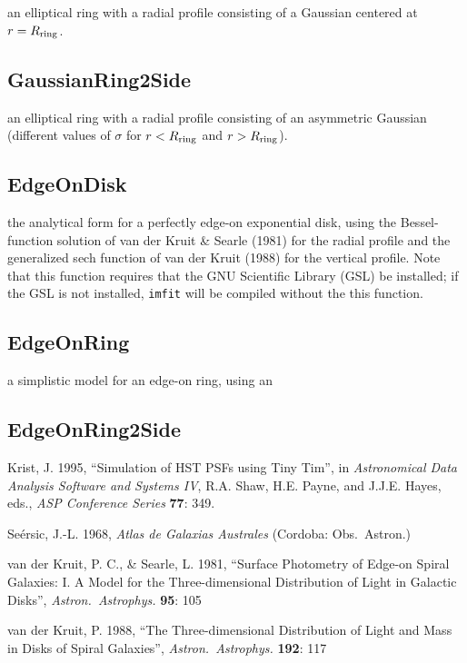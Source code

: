 \documentclass[10pt]{article}
\newcommand{\imfit}{\texttt{imfit}}
\begin{document}
an elliptical ring with a radial profile
consisting of a Gaussian centered at $r = R_{\rm ring}$.


\subsection{GaussianRing2Side}

an elliptical ring with a radial profile
consisting of an asymmetric Gaussian (different values of $\sigma$ for
$r < R_{\rm ring}$ and $r > R_{\rm ring}$).


\subsection{EdgeOnDisk}

the analytical form for a perfectly edge-on exponential
disk, using the Bessel-function solution of van der Kruit \& Searle (1981) for 
the radial profile and the generalized sech function of van der Kruit (1988) 
for the vertical profile. Note that this function requires that the GNU
Scientific Library (GSL) be installed; if the GSL is not installed, \imfit{}
will be compiled without the this function.


\subsection{EdgeOnRing}

a simplistic model for an edge-on ring, using an


\subsection{EdgeOnRing2Side}






\begin{thebibliography}{}

 Krist, J. 1995, ``Simulation of HST PSFs using Tiny Tim'', 
in \textit{Astronomical Data Analysis Software and Systems IV}, 
R.A. Shaw, H.E. Payne, and J.J.E. Hayes, eds., \textit{ASP Conference Series} \textbf{77}: 349.

 Se{\'e}rsic, J.-L. 1968, \textit{Atlas de 
Galaxias Australes} (Cordoba: Obs.\ Astron.)

 van der Kruit, P. C., \&
Searle, L. 1981, ``Surface Photometry of Edge-on Spiral Galaxies: I. A
Model for the Three-dimensional Distribution of Light in Galactic
Disks'', \textit{Astron.\ Astrophys.} \textbf{95}: 105

 van der Kruit, P. 1988, ``The
Three-dimensional Distribution of Light and Mass in Disks of Spiral
Galaxies'', \textit{Astron.\ Astrophys.} \textbf{192}: 117


\end{thebibliography}
%
\end{document}
